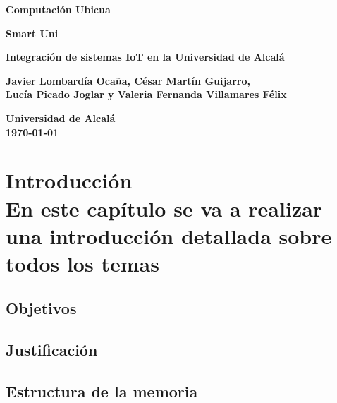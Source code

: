 \documentclass[12pt]{report}
\begin{document}
\begin{titlepage}
    \begin{center}
        \vspace*{1cm}
        
        \textbf{\huge Computación Ubicua}
        
        \vspace{0.5cm}
        \textbf{\large Smart Uni}
        
        \vspace{1.5cm}
        
        \textbf{\huge Integración de sistemas IoT en la Universidad de Alcalá}
        
        \vspace{2cm}
        
        \textbf{\large Javier Lombardía Ocaña, César Martín Guijarro,}\\
        \textbf{\large Lucía Picado Joglar y Valeria Fernanda Villamares Félix}
        
        \vfill
        
        \textbf{\large Universidad de Alcalá}\\
        \textbf{\large \today}
        
    \end{center}
\end{titlepage}


\tableofcontents



\chapter[Introducción]{Introducción\\ \normalsize En este capítulo se va a realizar una introducción detallada sobre todos los temas}
\section{Objetivos}
\lipsum[1-2] %
\newpage
\section{Justificación}
\lipsum[3-4]
\newpage
\section{Estructura de la memoria}
\lipsum[5-6]
\end{document}
